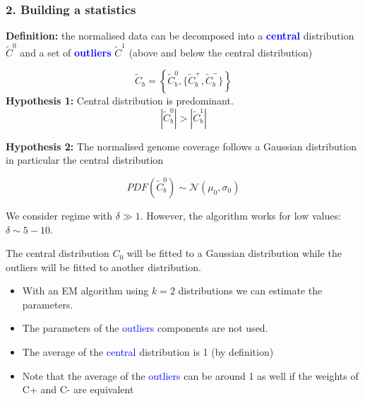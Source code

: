 \documentclass{beamer}
\begin{document}
\begin{frame}
 \frametitle{2. Building a statistics}
 
\textbf{Definition:} the normalised data can be decomposed 
into a \textbf{\textcolor{blue}{central}}
distribution $\widetilde{C}^0$ and a set 
of \textbf{\textcolor{blue}{outliers}} $\widetilde{C}^1$ (above and below 
the central distribution)

\begin{equation} 
\widetilde{C}_b  = \left\{ \widetilde{C}^0_b, \{\widetilde{C}^+_b, 
\widetilde{C}^-_b\}  \right\}
\nonumber
\end{equation}
\vspace{1cm}
\textbf{Hypothesis 1:} Central distribution is predominant.
\begin{equation}
\left|\widetilde{C}^0_b\right| > \left|\widetilde{C}^1_b\right| \nonumber
\end{equation}
\end{frame}



\begin{frame}
\textbf{Hypothesis 2:} The normalised genome coverage follows a 
Gaussian distribution in particular the central distribution

\begin{equation}
PDF(\widetilde{C}_b^0) \sim \mathcal{N}(\mu_0, \sigma_0) \nonumber
\end{equation}

We consider regime with $\delta \gg 1$. However, the algorithm 
works for low values: $\delta \sim 5-10$.
 \end{frame}


\begin{frame}
 
The central distribution $C_0$ will be fitted to a Gaussian 
distribution while the outliers will be fitted to another 
distribution.

\begin{itemize}
\item With an EM algorithm using $k=2$ distributions we can estimate the 
parameters. 
\item The parameters of the \textcolor{blue}{outliers} components are not used. 
\item The average of the \textcolor{blue}{central} distribution is  1 (by 
definition)
\item Note that the average of the \textcolor{blue}{outliers} can be around 1 as
well if the weights of C+ and C- are equivalent
\end{itemize}
\end{frame}
\end{document}
